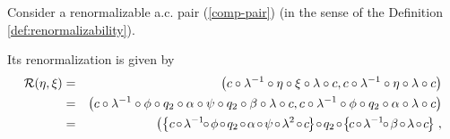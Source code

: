 Consider a renormalizable a.c. pair (\ref{comp-pair}) (in the sense of the Definition \ref{def:renormalizability}).

Its renormalization is given by 
\begin{eqnarray}
\nonumber \cR (\eta,\xi)&=&\left(c \circ \lambda^{-1} \circ \eta \circ \xi \circ \lambda \circ c  ,  c \circ \lambda^{-1} \circ \eta \circ \lambda \circ c \right)\\
\nonumber &=& \left(c \circ \lambda^{-1} \circ \phi \circ q_2 \circ \alpha \circ \psi \circ q_2  \circ \beta \circ \lambda \circ c  ,  c \circ \lambda^{-1} \circ \phi \circ q_2  \circ \alpha \circ \lambda \circ c \right) \\
\nonumber &=& \left(\left\{c  \hspace{-0.4mm} \circ \hspace{-0.4mm} \lambda^{-1} \! \! \circ \hspace{-0.4mm} \phi \hspace{-0.4mm} \circ \hspace{-0.4mm} q_2 \hspace{-0.4mm} \circ \hspace{-0.4mm} \alpha \hspace{-0.4mm} \circ \hspace{-0.4mm} \psi \hspace{-0.4mm} \circ \hspace{-0.4mm} \lambda^2 \hspace{-0.4mm} \circ \hspace{-0.4mm} c \hspace{-0.4mm} \right\} \! \circ \hspace{-0.4mm} q_2 \hspace{-0.4mm} \circ  \! \left\{ \hspace{-0.4mm} c \hspace{-0.4mm} \circ \hspace{-0.4mm} \lambda^{-1} \! \! \circ \hspace{-0.4mm} \beta \hspace{-0.4mm} \circ \hspace{-0.4mm} \lambda \hspace{-0.4mm} \circ \hspace{-0.4mm} c \hspace{-0.4mm} \right\}\right. , \\

\end{eqnarray}
